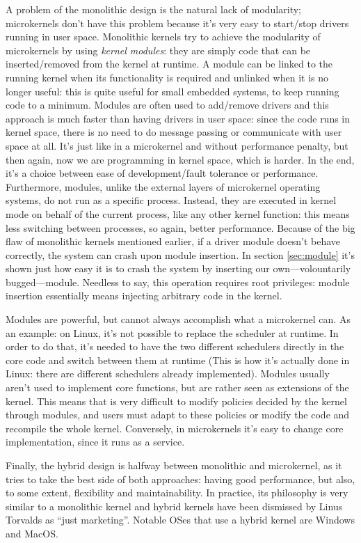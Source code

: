 \documentclass[10pt, oneside]{book}
\begin{document}
A problem of the monolithic design is the natural lack of modularity; microkernels don't have this problem because it's very easy to start/stop drivers running in user space. Monolithic kernels try to achieve the modularity of microkernels by using \textit{kernel modules}: they are simply code that can be inserted/removed from the kernel at runtime. A module can be linked to the running kernel when its functionality is required and unlinked when it is no longer useful: this is quite useful for small embedded systems, to keep running code to a minimum. Modules are often used to add/remove drivers and this approach is much faster than having drivers in user space: since the code runs in kernel space, there is no need to do message passing or communicate with user space at all. It's just like in a microkernel and without performance penalty, but then again, now we are programming in kernel space, which is harder. In the end, it's a choice between ease of development/fault tolerance or performance. Furthermore, modules, unlike the external layers of microkernel operating systems, do not run as a specific process. Instead, they are executed in kernel mode on behalf of the current process, like any other kernel function: this means less switching between processes, so again, better performance. Because of the big flaw of monolithic kernels mentioned earlier, if a driver module doesn't behave correctly, the system can crash upon module insertion. In section \ref{sec:module} it's shown just how easy it is to crash the system by inserting our own---volountarily bugged---module. Needless to say, this operation requires root privileges: module insertion essentially means injecting arbitrary code in the kernel.

Modules are powerful, but cannot always accomplish what a microkernel can. As an example: on Linux, it's not possible to replace the scheduler at runtime. In order to do that, it's needed to have the two different schedulers directly in the core code and switch between them at runtime (This is how it's actually done in Linux: there are different schedulers already implemented). Modules usually aren't used to implement core functions, but are rather seen as extensions of the kernel. This means that is very difficult to modify policies decided by the kernel through modules, and users must adapt to these policies or modify the code and recompile the whole kernel. Conversely, in microkernels it's easy to change core implementation, since it runs as a service.

Finally, the hybrid design is halfway between monolithic and microkernel, as it tries to take the best side of both approaches: having good performance, but also, to some extent, flexibility and maintainability. In practice, its philosophy is very similar to a monolithic kernel and hybrid kernels have been dismissed by Linus Torvalds as ``just marketing''\cite{torvalds}. Notable OSes that use a hybrid kernel are Windows and MacOS.
\end{document}
